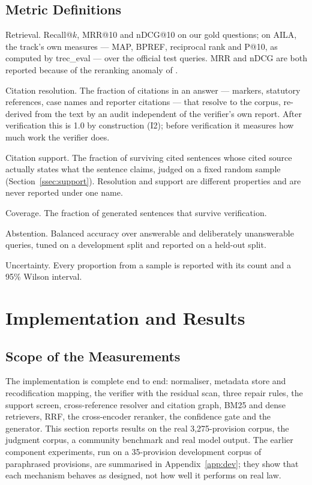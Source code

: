 \documentclass[conference]{IEEEtran}
\begin{document}
\subsection{Metric Definitions}

Retrieval. Recall@$k$, MRR@10 and nDCG@10 on our gold questions; on AILA, the track's own measures --- MAP, BPREF, reciprocal rank and P@10, as computed by trec\_eval --- over the official test queries. MRR and nDCG are both reported because of the reranking anomaly of \cite{rustamov2025}.

Citation resolution. The fraction of citations in an answer --- markers, statutory references, case names and reporter citations --- that resolve to the corpus, re-derived from the text by an audit independent of the verifier's own report. After verification this is 1.0 by construction (I2); before verification it measures how much work the verifier does.

Citation support. The fraction of surviving cited sentences whose cited source actually states what the sentence claims, judged on a fixed random sample (Section~\ref{ssec:support}). Resolution and support are different properties and are never reported under one name.

Coverage. The fraction of generated sentences that survive verification.

Abstention. Balanced accuracy over answerable and deliberately unanswerable queries, tuned on a development split and reported on a held-out split.

Uncertainty. Every proportion from a sample is reported with its count and a 95\% Wilson interval.

\section{Implementation and Results}

\subsection{Scope of the Measurements}

The implementation is complete end to end: normaliser, metadata store and recodification mapping, the verifier with the residual scan, three repair rules, the support screen, cross-reference resolver and citation graph, BM25 and dense retrievers, RRF, the cross-encoder reranker, the confidence gate and the generator. This section reports results on the real 3,275-provision corpus, the judgment corpus, a community benchmark and real model output. The earlier component experiments, run on a 35-provision development corpus of paraphrased provisions, are summarised in Appendix~\ref{app:dev}; they show that each mechanism behaves as designed, not how well it performs on real law.
\end{document}
